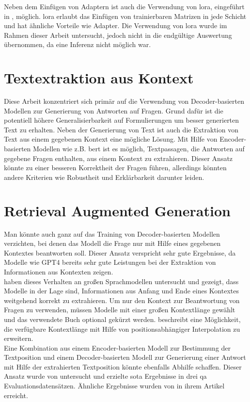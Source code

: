 Neben dem Einfügen von Adaptern ist auch die Verwendung von \ac{lora}, eingeführt in \citet{lora}, möglich.
\ac{lora} erlaubt das Einfügen von trainierbaren Matrizen in jede Schicht und hat ähnliche Vorteile wie Adapter.
Die Verwendung von \ac{lora} wurde im Rahmen dieser Arbeit untersucht, jedoch nicht in die endgültige Auswertung übernommen, da eine Inferenz nicht möglich war.

\section{Textextraktion aus Kontext}
Diese Arbeit konzentriert sich primär auf die Verwendung von Decoder-basierten Modellen zur Generierung von Antworten auf Fragen.
Grund dafür ist die potentiell höhere Generalisierbarkeit auf Formulierungen um besser generierten Text zu erhalten.
Neben der Generierung von Text ist auch die Extraktion von Text aus einem gegebenen Kontext eine mögliche Lösung.
Mit Hilfe von Encoder-basierten Modellen wie z.B. \ac{bert} ist es möglich, Textpassagen, die Antworten auf gegebene Fragen enthalten, aus einem Kontext zu extrahieren.
Dieser Ansatz könnte zu einer besseren Korrektheit der Fragen führen, allerdings könnten andere Kriterien wie Robustheit und Erklärbarkeit darunter leiden.\\

\section{Retrieval Augmented Generation}
Man könnte auch ganz auf das Training von Decoder-basierten Modellen verzichten, bei denen das Modell die Frage nur mit Hilfe eines gegebenen Kontextes beantworten soll.
Dieser Ansatz verspricht sehr gute Ergebnisse, da Modelle wie GPT4 bereits sehr gute Leistungen bei der Extraktion von Informationen aus Kontexten zeigen.\\

\citet{context-extract} haben dieses Verhalten an großen Sprachmodellen untersucht und gezeigt, dass Modelle in der Lage sind, Informationen aus Anfang und Ende eines Kontextes weitgehend korrekt zu extrahieren.
Um nur den Kontext zur Beantwortung von Fragen zu verwenden, müssen Modelle mit einer großen Kontextlänge gewählt und das verwendete Buch optional gekürzt werden. \citet{extending-context} beschreibt eine Möglichkeit, die verfügbare Kontextlänge mit Hilfe von positionsabhängiger Interpolation zu erweitern.\\
Eine Kombination aus einem Encoder-basierten Modell zur Bestimmung der Textposition und einem Decoder-basierten Modell zur Generierung einer Antwort mit Hilfe der extrahierten Textposition könnte ebenfalls Abhilfe schaffen. Dieser Ansatz wurde von \citet{retrieval-1} untersucht und erzielte \ac{sota} Ergebnisse in drei \ac{qa} Evaluationsdatensätzen. Ähnliche Ergebnisse wurden von \citet{retrieval-2} in ihrem Artikel erreicht.\\

